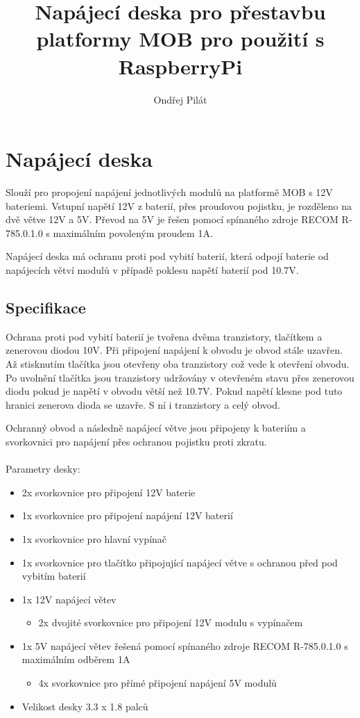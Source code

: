 \documentclass[a4paper,11pt]{article}
\author{Ondřej Pilát}
\title{Napájecí deska pro přestavbu platformy MOB pro použití s RaspberryPi}
\begin{document}
\maketitle
\newpage
\tableofcontents
\newpage
\section{Napájecí deska}
Slouží pro propojení napájení jednotlivých modulů na platformě MOB s 12V bateriemi. Vstupní napětí 12V z baterií, přes proudovou pojistku, je rozděleno na dvě větve 12V a 5V. Převod na 5V je řešen pomocí spínaného zdroje RECOM R-785.0.1.0 s maximálním povoleným proudem 1A. 

Napájecí deska má ochranu proti pod vybití baterií, která odpojí baterie od napájecích větví modulů v případě poklesu napětí baterií pod 10.7V. 

\subsection{Specifikace}

Ochrana proti pod vybití baterií je tvořena dvěma tranzistory, tlačítkem a zenerovou diodou 10V. Při připojení napájení k obvodu je obvod stále uzavřen. Až stisknutím tlačítka jsou otevřeny oba tranzistory což vede k otevření obvodu. Po uvolnění tlačítka jsou tranzistory udržovány v otevřeném stavu přes zenerovou diodu pokud je napětí v obvodu větší než 10.7V. Pokud napětí klesne pod tuto hranici zenerova dioda se uzavře. S ní i tranzistory a celý obvod.

Ochranný obvod a následně napájecí větve jsou připojeny k bateriím a svorkovnici pro napájení přes ochranou pojistku proti zkratu.
\\
\\
Parametry desky:
\begin{itemize}
	\item 2x svorkovnice pro připojení 12V baterie
	\item 1x svorkovnice pro připojení napájení 12V baterií
	\item 1x svorkovnice pro hlavní vypínač
	\item 1x svorkovnice pro tlačítko připojující napájecí větve s ochranou před pod vybitím baterií
	\item 1x 12V napájecí větev
		\begin{itemize}
			\item 2x dvojité svorkovnice pro připojení 12V modulu s vypínačem
		\end{itemize}
	\item 1x 5V napájecí větev řešená pomocí spínaného zdroje RECOM R-785.0.1.0 s maximálním odběrem 1A
		\begin{itemize}
			\item 4x svorkovnice pro přímé připojení napájení 5V modulů
		\end{itemize}
	\item Velikost desky 3.3 x 1.8 palců
\end{itemize}
\end{document}
